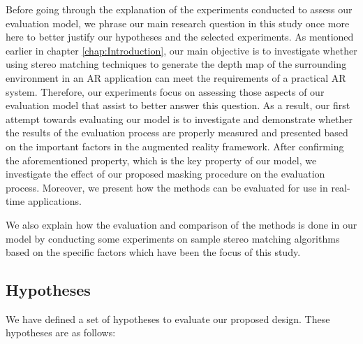 Before going through the explanation of the experiments conducted to assess our evaluation model, we phrase our main research question in this
study once more here to better justify our hypotheses and the selected experiments. 
As mentioned earlier in chapter \ref{chap:Introduction}, our main objective is to investigate whether using 
stereo matching techniques to generate the depth map of the 
surrounding environment in an AR application can meet the requirements of a practical AR system. 
Therefore, our experiments focus 
on assessing those aspects of our evaluation model that assist to better answer this question.
As a result, our first attempt towards evaluating our model is to investigate and demonstrate whether the results of the evaluation process 
are properly measured and presented based on the important factors in the augmented reality framework.
After confirming the aforementioned property, which is the key property of our model, we investigate the effect of our proposed masking 
procedure on the evaluation process. Moreover, we present how the methods can be evaluated for use in real-time applications. 

We also explain how the evaluation and comparison of the methods is done in our model by conducting some
experiments on sample stereo matching algorithms based on the specific factors
which have been the focus of this study.

\subsection{Hypotheses}

We have defined a set of hypotheses to evaluate our proposed design. These hypotheses are as follows:

